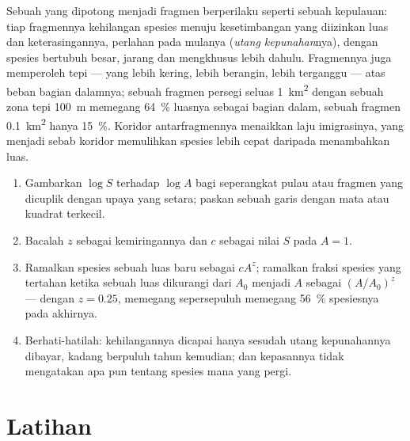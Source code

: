 \begin{proposition}[Fragmentasi]\label{prop:b1:ecosystem-dynamics:fragmentation}
Sebuah  yang dipotong menjadi fragmen berperilaku seperti
sebuah kepulauan: tiap fragmennya kehilangan spesies menuju
kesetimbangan yang diizinkan luas dan keterasingannya, perlahan pada
mulanya (\emph{utang kepunahan}nya), dengan spesies bertubuh besar,
jarang dan mengkhusus lebih dahulu. Fragmennya juga memperoleh tepi
--- yang lebih kering, lebih berangin, lebih terganggu --- atas beban
bagian dalamnya; sebuah fragmen persegi seluas \qty{1}{km^2} dengan
sebuah zona tepi \qty{100}{m} memegang \qty{64}{\%} luasnya sebagai
bagian dalam, sebuah fragmen \qty{0.1}{km^2} hanya \qty{15}{\%}.
Koridor antarfragmennya menaikkan laju imigrasinya, yang menjadi sebab
koridor memulihkan spesies lebih cepat daripada menambahkan luas.
\end{proposition}

\begin{method}\label{met:b1:ecosystem-dynamics:sar}
\begin{enumerate}
  \item Gambarkan $\log S$ terhadap $\log A$ bagi seperangkat pulau
        atau fragmen yang dicuplik dengan upaya yang setara; paskan
        sebuah garis dengan mata atau kuadrat terkecil.
  \item Bacalah $z$ sebagai kemiringannya dan $c$ sebagai nilai $S$
        pada $A = 1$.
  \item Ramalkan spesies sebuah luas baru sebagai $cA^z$; ramalkan
        fraksi spesies yang tertahan ketika sebuah luas dikurangi dari
        $A_0$ menjadi $A$ sebagai $(A/A_0)^z$ --- dengan $z = 0.25$,
        memegang sepersepuluh  memegang \qty{56}{\%}
        spesiesnya pada akhirnya.
  \item Berhati-hatilah: kehilangannya dicapai hanya sesudah utang
        kepunahannya dibayar, kadang berpuluh tahun kemudian; dan
        kepasannya tidak mengatakan apa pun tentang spesies mana yang
        pergi.
\end{enumerate}
\end{method}

\section{Latihan}

